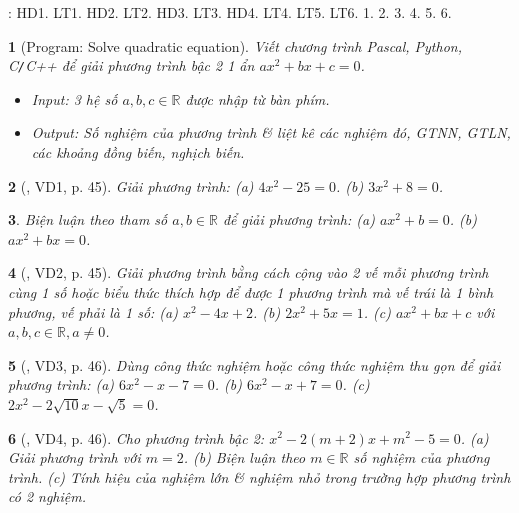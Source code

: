 \documentclass{article}
\newtheorem{baitoan}{}
\begin{document}
\noindent\cite[Chap. VII, \S2, pp. 52--60]{SGK_Toan_9_Canh_Dieu_tap_2}: HD1. LT1. HD2. LT2. HD3. LT3. HD4. LT4. LT5. LT6. 1. 2. 3. 4. 5. 6.

\begin{baitoan}[{\sf Program}: Solve quadratic equation]
	Viết chương trình {\sf Pascal, Python, C{\tt/}C++} để giải phương trình bậc 2 1 ẩn $ax^2 + bx + c = 0$.
	\begin{itemize}
		\item {\sf Input}: 3 hệ số $a,b,c\in\mathbb{R}$ được nhập từ bàn phím.
		\item {\sf Output}: Số nghiệm của phương trình \& liệt kê các nghiệm đó, {\rm GTNN, GTLN}, các khoảng đồng biến, nghịch biến.
	\end{itemize}
\end{baitoan}

\begin{baitoan}[\cite{Binh_boi_duong_Toan_9_tap_2}, VD1, p. 45]
	Giải phương trình: (a) $4x^2 - 25 = 0$. (b) $3x^2 + 8 = 0$.
\end{baitoan}

\begin{baitoan}
	Biện luận theo tham số $a,b\in\mathbb{R}$ để giải phương trình: (a) $ax^2 + b = 0$. (b) $ax^2 + bx = 0$.
\end{baitoan}

\begin{baitoan}[\cite{Binh_boi_duong_Toan_9_tap_2}, VD2, p. 45]
	Giải phương trình bằng cách cộng vào 2 vế mỗi phương trình cùng 1 số hoặc biểu thức thích hợp để được 1 phương trình mà vế trái là 1 bình phương, vế phải là 1 số: (a) $x^2 - 4x + 2$. (b) $2x^2 + 5x = 1$. (c) $ax^2 + bx + c$ với $a,b,c\in\mathbb{R},a\ne0$.
\end{baitoan}

\begin{baitoan}[\cite{Binh_boi_duong_Toan_9_tap_2}, VD3, p. 46]
	Dùng công thức nghiệm hoặc công thức nghiệm thu gọn để giải phương trình: (a) $6x^2 - x - 7 = 0$. (b) $6x^2 - x + 7 = 0$. (c) $2x^2 - 2\sqrt{10}x - \sqrt{5} = 0$.
\end{baitoan}

\begin{baitoan}[\cite{Binh_boi_duong_Toan_9_tap_2}, VD4, p. 46]
	Cho phương trình bậc 2: $x^2 - 2(m + 2)x + m^2 - 5 = 0$. (a) Giải phương trình với $m = 2$. (b) Biện luận theo $m\in\mathbb{R}$ số nghiệm của phương trình. (c) Tính hiệu của nghiệm lớn \& nghiệm nhỏ trong trường hợp phương trình có 2 nghiệm.
\end{baitoan}
\end{document}
